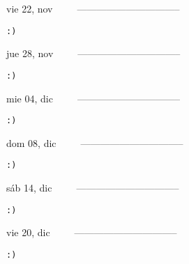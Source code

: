 \documentclass[letterpaper,10pt]{article}
\begin{document}
\begin{multicols}{3}
{vie 22, nov\ \ \ \ \ --------------------------------}
\begin{flushright}\begin{small}\texttt{:)}\end{small}\end{flushright}
\vfill
{jue 28, nov\ \ \ \ \ --------------------------------}
\begin{flushright}\begin{small}\texttt{:)}\end{small}\end{flushright}\par
\vfill
{mie 04, dic\ \ \ \ \ --------------------------------}
\begin{flushright}\begin{small}\texttt{:)}\end{small}\end{flushright}\par
\vfill
\end{multicols}
\vspace{1.05cm}

\begin{multicols}{3}
{dom 08, dic\ \ \ \ \ --------------------------------}
\begin{flushright}\begin{small}\texttt{:)}\end{small}\end{flushright}
\vfill
{sáb 14, dic\ \ \ \ \ --------------------------------}
\begin{flushright}\begin{small}\texttt{:)}\end{small}\end{flushright}\par
\vfill
{vie 20, dic\ \ \ \ \ --------------------------------}
\begin{flushright}\begin{small}\texttt{:)}\end{small}\end{flushright}\par
\vfill
\end{multicols}
\vspace{1.05cm}
\end{document}
